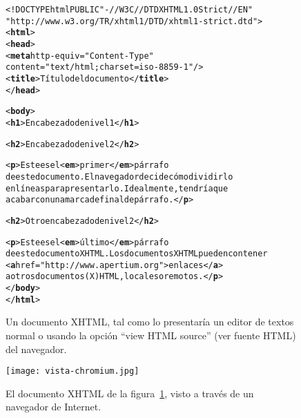 \begin{figure} \begin{center} 
\begin{alltt} 
<!DOCTYPE html PUBLIC "-//W3C//DTD XHTML 1.0 Strict//EN" 
      "http://www.w3.org/TR/xhtml1/DTD/xhtml1-strict.dtd"> 
<\textbf{html}> 
  <\textbf{head}> 
    <\textbf{meta} http-equiv="Content-Type" 
          content="text/html; charset=iso-8859-1"/> 
    <\textbf{title}>Título del documento</\textbf{title}> 
  </\textbf{head}> 

  <\textbf{body}> 
    <\textbf{h1}>Encabezado de nivel 1</\textbf{h1}> 

    <\textbf{h2}>Encabezado de nivel 2</\textbf{h2}> 

    <\textbf{p}>Este es el <\textbf{em}>primer</\textbf{em}> párrafo 
    de este documento. El navegador decide cómo dividirlo 
    en líneas para presentarlo. Idealmente, tendría que 
    acabar con una marca de final de párrafo. </\textbf{p}> 

    <\textbf{h2}>Otro encabezado de nivel 2</\textbf{h2}> 

    <\textbf{p}>Este es el <\textbf{em}>último</\textbf{em}> párrafo 
    de este documento XHTML. Los documentos XHTML pueden contener 
    <\textbf{a} href="http://www.apertium.org">enlaces</\textbf{a}> 
    a otros documentos (X)HTML, locales o remotos. </\textbf{p}> 
  </\textbf{body}> 
</\textbf{html}> 
\end{alltt} \end{center} \caption{Un documento XHTML, tal como lo presentaría un editor de textos normal o usando la opción ``view HTML source'' (ver fuente HTML) del navegador.} \label{fg:HTML} \end{figure} 

\begin{figure} \begin{center} \texttt{[image: vista-chromium.jpg]} \end{center} \caption{El documento XHTML de la figura~\protect\ref{fg:HTML}, visto a través de un navegador de Internet.} \label{fg:HTMLnav} \end{figure} 

